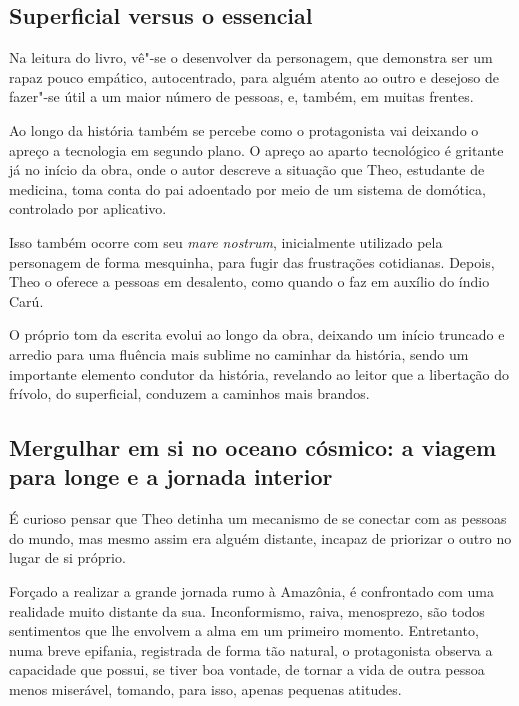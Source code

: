 \documentclass[12pt]{extarticle}
\begin{document}
\subsection{Superficial versus o essencial}

Na leitura do livro, vê"-se o desenvolver da personagem, que demonstra
ser um rapaz pouco empático, autocentrado, para alguém atento ao outro e
desejoso de fazer"-se útil a um maior número de pessoas, e, também, em
muitas frentes.

Ao longo da história também se percebe como o protagonista vai deixando
o apreço a tecnologia em segundo plano. O apreço ao aparto tecnológico é
gritante já no início da obra, onde o autor descreve a situação que
Theo, estudante de medicina, toma conta do pai adoentado por meio de um
sistema de domótica, controlado por aplicativo.

Isso também ocorre com seu \emph{mare nostrum}, inicialmente utilizado
pela personagem de forma mesquinha, para fugir das frustrações
cotidianas. Depois, Theo o oferece a pessoas em desalento, como quando o
faz em auxílio do índio Carú.

O próprio tom da escrita evolui ao longo da obra, deixando um início
truncado e arredio para uma fluência mais sublime no caminhar da
história, sendo um importante elemento condutor da história, revelando
ao leitor que a libertação do frívolo, do superficial, conduzem a
caminhos mais brandos.

\subsection{Mergulhar em si no oceano cósmico: a viagem para longe e a
jornada interior}

É curioso pensar que Theo detinha um mecanismo de se conectar com as
pessoas do mundo, mas mesmo assim era alguém distante, incapaz de
priorizar o outro no lugar de si próprio.

Forçado a realizar a grande jornada rumo à Amazônia, é confrontado com
uma realidade muito distante da sua. Inconformismo, raiva, menosprezo,
são todos sentimentos que lhe envolvem a alma em um primeiro momento.
Entretanto, numa breve epifania, registrada de forma tão natural, o
protagonista observa a capacidade que possui, se tiver boa vontade, de
tornar a vida de outra pessoa menos miserável, tomando, para isso,
apenas pequenas atitudes.
\end{document}
